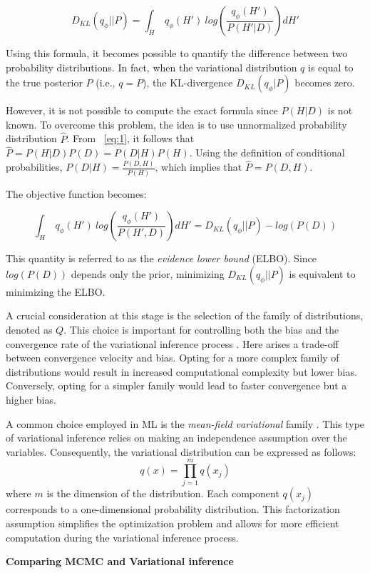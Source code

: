 \[
	D_{KL}(q_{\phi} || P) = \int_{H} \ q_{\phi}(H') \ log(\frac{q_{\phi}(H')}{P(H'|D)}) dH'
\]

Using this formula, it becomes possible to quantify the difference between two probability distributions. In fact, when the variational distribution $q$ is equal to the true posterior $P$ (i.e., $q = P$), the KL-divergence $D_{KL}(q_{\phi} | P)$ becomes zero.

However, it is not possible to compute the exact formula since $P(H|D)$ is not known. To overcome this problem, the idea is to use unnormalized probability distribution $\hat{P}$.
From \Eq~\ref{eq:1}, it follows that $\hat{P} = P(H|D)P(D) = P(D|H)P(H)$. Using the definition of conditional probabilities, $P(D|H) = \frac{P(D,H)}{P(H)}$, which implies that $\hat{P} = P(D,H)$. 

The objective function becomes:

\[
	\int_{H} \ q_{\phi}(H') \ log(\frac{q_{\phi}(H')}{P(H',D)}) dH' = D_{KL}(q_{\phi} || P) - log(P(D))
\]

This quantity is referred to as the \textit{evidence lower bound} (ELBO). Since $log(P(D))$ depends only the prior, minimizing $D_{KL}(q_{\phi} || P)$ is equivalent to minimizing the ELBO.

A crucial consideration at this stage is the selection of the family of distributions, denoted as $Q$. This choice is important for controlling both the bias and the convergence rate of the variational inference process \cite{doi:10.1080/01621459.2017.1285773}. Here arises a trade-off between convergence velocity and bias. Opting for a more complex family of distributions would result in increased computational complexity but lower bias. Conversely, opting for a simpler family would lead to faster convergence but a higher bias.

A common choice employed in ML is the \textit{mean-field variational} family \cite{Han2019StatisticalII}. This type of variational inference relies on making an independence assumption over the variables. Consequently, the variational distribution can be expressed as follows:
\[
	q(x) = \prod_{j=1}^{m} q(x_j)
\] 
where $m$ is the dimension of the distribution. Each component $q(x_j)$ corresponds to a one-dimensional probability distribution. This factorization assumption simplifies the optimization problem and allows for more efficient computation during the variational inference process.

\vspace{0.2cm}
\textbf{Comparing MCMC and  Variational inference}

